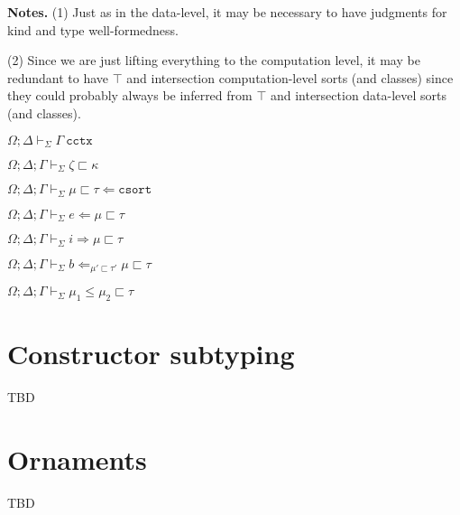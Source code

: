 \documentclass[letterpaper, 11pt]{article}
\newcommand{\Rar}{\Rightarrow}
\newcommand{\Lar}{\Leftarrow}
\newcommand{\csort}{\texttt{csort}}
\newcommand{\cctx}{\texttt{cctx}}
\begin{document}
    \textbf{Notes.} (1) Just as in the data-level, it may be necessary to have judgments for kind and type well-formedness.

    (2) Since we are just lifting everything to the computation level, it may be redundant to have $\top$ and intersection computation-level sorts (and 
    classes) since they could probably always be inferred from $\top$ and intersection data-level sorts (and classes).

    $\boxed{\Omega; \Delta \vdash_\Sigma \Gamma \ \cctx}$
    
    

    $\boxed{\Omega; \Delta; \Gamma \vdash_\Sigma \zeta \sqsubset \kappa}$

    $\boxed{\Omega; \Delta; \Gamma \vdash_\Sigma \mu \sqsubset \tau \Lar \csort}$

    $\boxed{\Omega; \Delta; \Gamma \vdash_\Sigma e \Lar \mu \sqsubset \tau}$

    $\boxed{\Omega; \Delta; \Gamma \vdash_\Sigma i \Rar \mu \sqsubset \tau}$

    $\boxed{\Omega; \Delta; \Gamma \vdash_\Sigma b \Lar_{\mu' \sqsubset \tau'} \mu \sqsubset \tau}$

    $\boxed{\Omega; \Delta; \Gamma \vdash_\Sigma \mu_1 \leq \mu_2 \sqsubset \tau}$

    \section{Constructor subtyping}
    TBD

    \section{Ornaments}
    TBD

    
        
\end{document}

